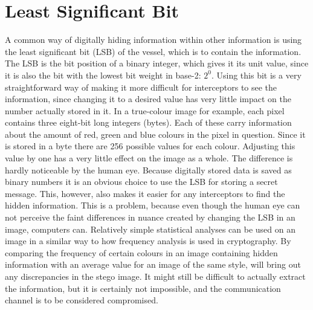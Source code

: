 \section{Least Significant Bit}
A common way of digitally hiding information within other information is using the least significant bit (LSB) of the vessel, which is to contain the information. 
The LSB is the bit position of a binary integer, which gives it its unit value, since it is also the bit with the lowest bit weight in base-2: $2^0$.
Using this bit is a very straightforward way of making it more difficult for interceptors to see the information, since changing it to a desired value has very little impact on the number actually stored in it.
In a true-colour image for example, each pixel contains three eight-bit long integers (bytes). Each of these carry information about the amount of red, green and blue colours in the pixel in question.
Since it is stored in a byte there are 256 possible values for each colour. Adjusting this value by one has a very little effect on the image as a whole. The difference is hardly noticeable by the human eye.
Because digitally stored data is saved as binary numbers it is an obvious choice to use the LSB for storing a secret message. This, however, also makes it easier for any interceptors to find the hidden information.
This is a problem, because even though the human eye can not perceive the  faint differences in nuance created by changing the LSB in an image, computers can. 
Relatively simple statistical analyses can be used on an image in a similar way to how frequency analysis is used in cryptography. 
By comparing the frequency of certain colours in an image containing hidden information with an average value for an image of the same style, will bring out any discrepancies in the stego image. 
It might still be difficult to actually extract the information, but it is certainly not impossible, and the communication channel is to be considered compromised.